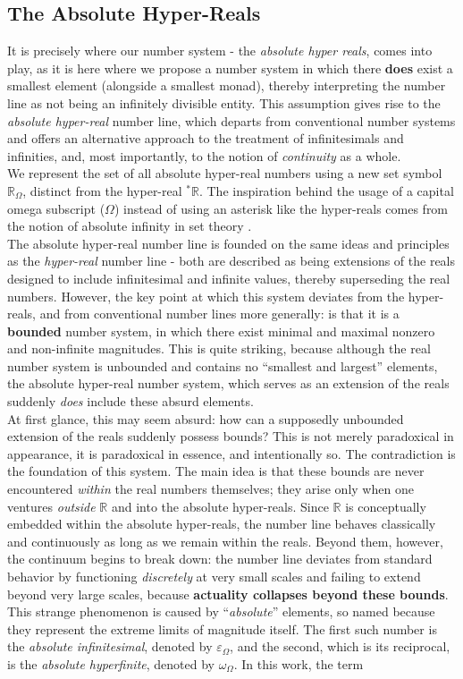 \documentclass{article}
\begin{document}
\subsection{The Absolute Hyper-Reals} It  is precisely where our number system - the \textit{absolute hyper reals}, comes into play, as it is here where we propose a number system in which there \textbf{does} exist a smallest element (alongside a smallest monad), thereby interpreting the number line as not being an infinitely divisible entity. This assumption gives rise to the \textit{absolute hyper-real} number line, which departs from conventional number systems and offers an alternative approach to the treatment of infinitesimals and infinities, and, most importantly, to the notion of \emph{continuity} as a whole.\\ We represent the set of all absolute hyper-real numbers using a new set symbol $\mathbb{R}_\Omega$, distinct from the hyper-real ${}^\ast\mathbb{R}$. The inspiration behind the usage of a capital omega subscript ($\Omega$) instead of using an asterisk like the hyper-reals comes from the notion of absolute infinity in set theory \cite{wiki_absolute_infinite}. \\ The absolute hyper-real number line is founded on the same ideas and principles as the \textit{hyper-real} number line - both are described as being extensions of the reals designed to include infinitesimal and infinite values, thereby superseding the real numbers. However, the key point at which this system deviates from the hyper-reals, and from conventional number lines more generally: is that it is a \textbf{bounded} number system, in which there exist minimal and maximal nonzero and non-infinite magnitudes. This is quite striking, because although the real number system is unbounded and contains no ``smallest and largest'' elements, the absolute hyper-real number system, which serves as an extension of the reals suddenly \textit{does} include these absurd elements.\\At first glance, this may seem absurd: how can a supposedly unbounded extension of the reals suddenly possess bounds? This is not merely paradoxical in appearance, it is paradoxical in essence, and intentionally so. The contradiction is the foundation of this system. The main idea is that these bounds are never encountered \textit{within} the real numbers themselves; they arise only when one ventures \textit{outside} $\mathbb{R}$ and into the absolute hyper-reals. Since $\mathbb{R}$ is conceptually embedded within the absolute hyper-reals, the number line behaves classically and continuously as long as we remain within the reals. Beyond them, however, the continuum begins to break down: the number line deviates from standard behavior by functioning \textit{discretely} at very small scales and failing to extend beyond very large scales, because \textbf{actuality collapses beyond these bounds}. This strange phenomenon is caused by ``\textit{absolute}'' elements, so named because they represent the extreme limits of magnitude itself. The first such number is the \emph{absolute infinitesimal}, denoted by $\varepsilon_\Omega$, and the second, which is its reciprocal, is the \emph{absolute hyperfinite}, denoted by $\omega_\Omega$. In this work, the term 
\end{document}
